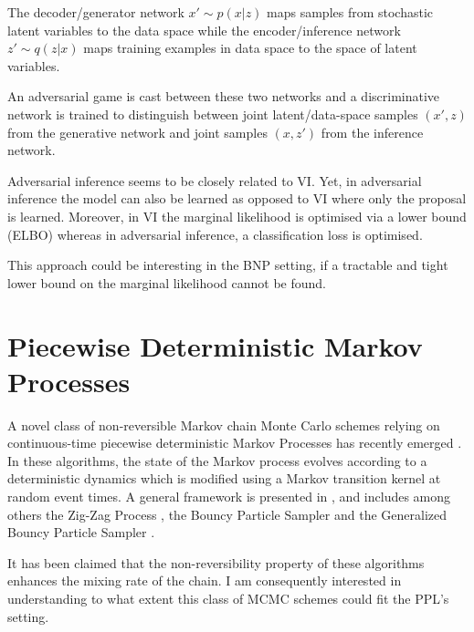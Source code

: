 The decoder/generator network $x' \sim p(x|z)$ maps samples from stochastic latent variables to the data space while the encoder/inference network $z' \sim q(z|x)$ maps training examples in data space to the space of latent variables.

An adversarial game is cast between these two networks and a discriminative network is trained to distinguish between joint latent/data-space samples $(x', z)$ from the generative network and joint samples $(x, z')$ from the inference network.

Adversarial inference seems to be closely related to \gls{VI}. Yet, in adversarial inference the model can also be learned as opposed to \gls{VI} where only the proposal is learned. Moreover, in \gls{VI} the marginal likelihood is optimised via a lower bound (ELBO) whereas in adversarial inference, a classification loss is optimised.

This approach could be interesting in the \gls{BNP} setting, if a tractable and tight lower bound on the marginal likelihood cannot be found.



\section{Piecewise Deterministic Markov Processes}
A novel class of non-reversible Markov chain Monte Carlo schemes relying on continuous-time piecewise deterministic Markov Processes has recently emerged \cite{Vanetti:2017ux}. In these algorithms, the state of the Markov process evolves according to a deterministic dynamics which is modified using a Markov transition kernel at random event times. A general framework is presented in \cite{Bierkens:2017we}, and includes among others the Zig-Zag Process \cite{Bierkens:2016uk}, the Bouncy Particle Sampler \cite{BouchardCote:2017gs} and the Generalized Bouncy Particle Sampler \cite{Wu:2017uz}.


It has been claimed \cite{Bierkens:2017we} that the non-reversibility property of these algorithms enhances the mixing rate of the chain.
I am consequently interested in understanding to what extent this class of MCMC schemes could fit the \gls{PPL}'s setting.




